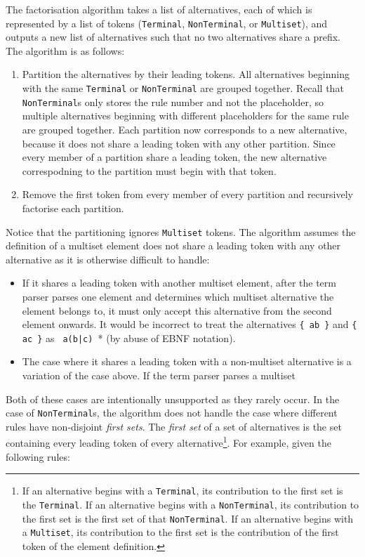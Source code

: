 The factorisation algorithm takes a list of alternatives, each of which is represented by a list of tokens (\lstinline{Terminal}, \lstinline{NonTerminal}, or \lstinline{Multiset}), and outputs a new list of alternatives such that no two alternatives share a prefix. The algorithm is as follows:
\begin{enumerate}
    \item Partition the alternatives by their leading tokens. All alternatives beginning with the same \lstinline{Terminal} or \lstinline{NonTerminal} are grouped together. Recall that \lstinline{NonTerminal}s only stores the rule number and not the placeholder, so multiple alternatives beginning with different placeholders for the same rule are grouped together. Each partition now corresponds to a new alternative, because it does not share a leading token with any other partition. Since every member of a partition share a leading token, the new alternative correspodning to the partition must begin with that token. 
    \item Remove the first token from every member of every partition and recursively factorise each partition.
\end{enumerate}
Notice that the partitioning ignores \lstinline{Multiset} tokens. The algorithm assumes the definition of a multiset element does not share a leading token with any other alternative as it is otherwise difficult to handle:
\begin{itemize}
    \item If it shares a leading token with another multiset element, after the term parser parses one element and determines which multiset alternative the element belongs to, it must only accept this alternative from the second element onwards. It would be incorrect to treat the alternatives \lstinline|{ ab }| and \lstinline|{ ac }| as \lstinline*{ a(b|c) }* (by abuse of EBNF notation).
    \item The case where it shares a leading token with a non-multiset alternative is a variation of the case above. If the term parser parses a multiset 
\end{itemize}
Both of these cases are intentionally unsupported as they rarely occur. In the case of \lstinline{NonTerminal}s, the algorithm does not handle the case where different rules have non-disjoint \textit{first sets}. The \textit{first set} of a set of alternatives is the set containing every leading token of every alternative\footnote{If an alternative begins with a \lstinline{Terminal}, its contribution to the first set is the \lstinline{Terminal}. If an alternative begins with a \lstinline{NonTerminal}, its contribution to the first set is the first set of that \lstinline{NonTerminal}. If an alternative begins with a \lstinline{Multiset}, its contribution to the first set is the contribution of the first token of the element definition.}. For example, given the following rules:
